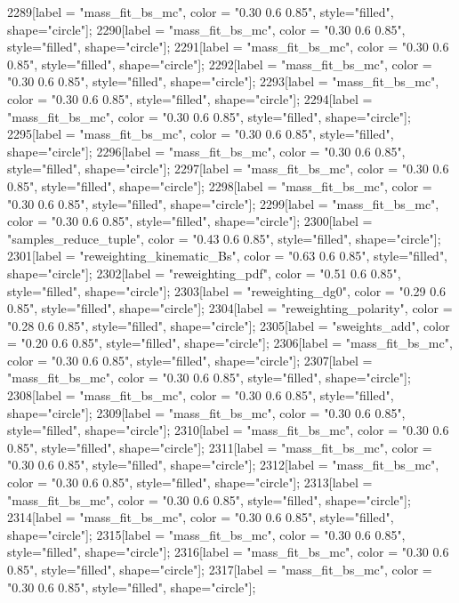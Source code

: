 {	2289[label = "mass_fit_bs_mc", color = "0.30 0.6 0.85", style="filled", shape="circle"];
	2290[label = "mass_fit_bs_mc", color = "0.30 0.6 0.85", style="filled", shape="circle"];
	2291[label = "mass_fit_bs_mc", color = "0.30 0.6 0.85", style="filled", shape="circle"];
	2292[label = "mass_fit_bs_mc", color = "0.30 0.6 0.85", style="filled", shape="circle"];
	2293[label = "mass_fit_bs_mc", color = "0.30 0.6 0.85", style="filled", shape="circle"];
	2294[label = "mass_fit_bs_mc", color = "0.30 0.6 0.85", style="filled", shape="circle"];
	2295[label = "mass_fit_bs_mc", color = "0.30 0.6 0.85", style="filled", shape="circle"];
	2296[label = "mass_fit_bs_mc", color = "0.30 0.6 0.85", style="filled", shape="circle"];
	2297[label = "mass_fit_bs_mc", color = "0.30 0.6 0.85", style="filled", shape="circle"];
	2298[label = "mass_fit_bs_mc", color = "0.30 0.6 0.85", style="filled", shape="circle"];
	2299[label = "mass_fit_bs_mc", color = "0.30 0.6 0.85", style="filled", shape="circle"];
	2300[label = "samples_reduce_tuple", color = "0.43 0.6 0.85", style="filled", shape="circle"];
	2301[label = "reweighting_kinematic_Bs", color = "0.63 0.6 0.85", style="filled", shape="circle"];
	2302[label = "reweighting_pdf", color = "0.51 0.6 0.85", style="filled", shape="circle"];
	2303[label = "reweighting_dg0", color = "0.29 0.6 0.85", style="filled", shape="circle"];
	2304[label = "reweighting_polarity", color = "0.28 0.6 0.85", style="filled", shape="circle"];
	2305[label = "sweights_add", color = "0.20 0.6 0.85", style="filled", shape="circle"];
	2306[label = "mass_fit_bs_mc", color = "0.30 0.6 0.85", style="filled", shape="circle"];
	2307[label = "mass_fit_bs_mc", color = "0.30 0.6 0.85", style="filled", shape="circle"];
	2308[label = "mass_fit_bs_mc", color = "0.30 0.6 0.85", style="filled", shape="circle"];
	2309[label = "mass_fit_bs_mc", color = "0.30 0.6 0.85", style="filled", shape="circle"];
	2310[label = "mass_fit_bs_mc", color = "0.30 0.6 0.85", style="filled", shape="circle"];
	2311[label = "mass_fit_bs_mc", color = "0.30 0.6 0.85", style="filled", shape="circle"];
	2312[label = "mass_fit_bs_mc", color = "0.30 0.6 0.85", style="filled", shape="circle"];
	2313[label = "mass_fit_bs_mc", color = "0.30 0.6 0.85", style="filled", shape="circle"];
	2314[label = "mass_fit_bs_mc", color = "0.30 0.6 0.85", style="filled", shape="circle"];
	2315[label = "mass_fit_bs_mc", color = "0.30 0.6 0.85", style="filled", shape="circle"];
	2316[label = "mass_fit_bs_mc", color = "0.30 0.6 0.85", style="filled", shape="circle"];
	2317[label = "mass_fit_bs_mc", color = "0.30 0.6 0.85", style="filled", shape="circle"];
}
